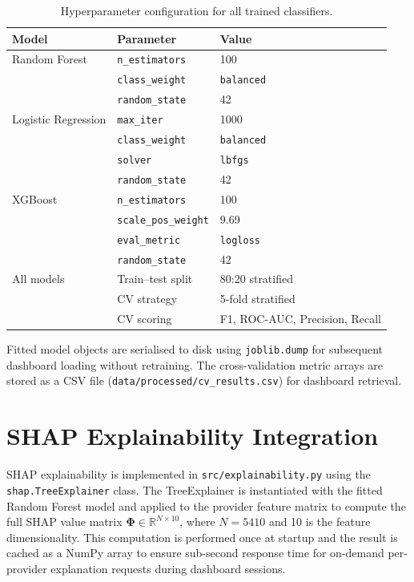 \begin{table}[htbp]
\centering
\caption{Hyperparameter configuration for all trained classifiers.}
\label{tab:hyperparams}
\begin{tabular}{@{}lll@{}}
\toprule
\textbf{Model} & \textbf{Parameter} & \textbf{Value} \\
\midrule
Random Forest        & \texttt{n\_estimators}      & 100 \\
                     & \texttt{class\_weight}      & \texttt{balanced} \\
                     & \texttt{random\_state}      & 42 \\
\midrule
Logistic Regression  & \texttt{max\_iter}          & 1000 \\
                     & \texttt{class\_weight}      & \texttt{balanced} \\
                     & \texttt{solver}             & \texttt{lbfgs} \\
                     & \texttt{random\_state}      & 42 \\
\midrule
XGBoost              & \texttt{n\_estimators}      & 100 \\
                     & \texttt{scale\_pos\_weight} & 9.69 \\
                     & \texttt{eval\_metric}       & \texttt{logloss} \\
                     & \texttt{random\_state}      & 42 \\
\midrule
All models           & Train--test split           & 80:20 stratified \\
                     & CV strategy                 & 5-fold stratified \\
                     & CV scoring                  & F1, ROC-AUC, Precision, Recall \\
\bottomrule
\end{tabular}
\end{table}

Fitted model objects are serialised to disk using \texttt{joblib.dump} for subsequent dashboard loading without retraining. The cross-validation metric arrays are stored as a CSV file (\texttt{data/processed/cv\_results.csv}) for dashboard retrieval.

\section{SHAP Explainability Integration}
\label{sec:impl-shap}

SHAP explainability is implemented in \texttt{src/explainability.py} using the \texttt{shap.TreeExplainer} class. The TreeExplainer is instantiated with the fitted Random Forest model and applied to the provider feature matrix to compute the full SHAP value matrix $\boldsymbol{\Phi} \in \mathbb{R}^{N \times 10}$, where $N = 5410$ and 10 is the feature dimensionality. This computation is performed once at startup and the result is cached as a NumPy array to ensure sub-second response time for on-demand per-provider explanation requests during dashboard sessions.

